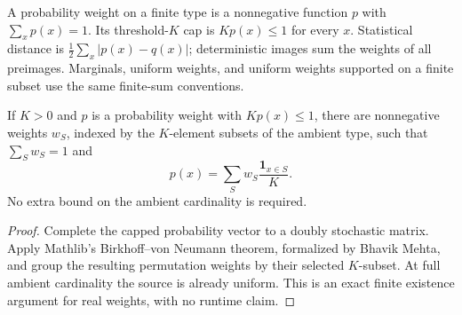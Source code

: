 \begin{definition}
  \label{def:lowerbounds-algebraic-probability-weights}
  \leanok
  A probability weight on a finite type is a nonnegative function $p$
  with $\sum_xp(x)=1$. Its threshold-$K$ cap is $Kp(x)\le1$ for every $x$.
  Statistical distance is $\frac12\sum_x|p(x)-q(x)|$; deterministic images
  sum the weights of all preimages. Marginals, uniform weights, and uniform
  weights supported on a finite subset use the same finite-sum conventions.
\end{definition}

\begin{theorem}
  \label{thm:lowerbounds-algebraic-capped-flat-mixture}
  \leanok
  If $K>0$ and $p$ is a probability weight with $Kp(x)\le1$, there are
  nonnegative weights $w_S$, indexed by the $K$-element subsets of the
  ambient type, such that $\sum_Sw_S=1$ and
  \[
    p(x)=\sum_S w_S\frac{\mathbf1_{x\in S}}{K}.
  \]
  No extra bound on the ambient cardinality is required.
\end{theorem}
\begin{proof}
  \leanok
  Complete the capped probability vector to a doubly stochastic matrix.
  Apply Mathlib's Birkhoff--von Neumann theorem, formalized by Bhavik Mehta,
  and group the resulting permutation weights by their selected $K$-subset.
  At full ambient cardinality the source is already uniform. This is an
  exact finite existence argument for real weights, with no runtime claim.
\end{proof}

